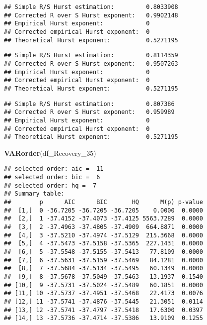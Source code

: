 \documentclass[
]{article}
\newenvironment{Shaded}{\begin{snugshade}}{\end{snugshade}}
\newcommand{\FunctionTok}[1]{\textcolor[rgb]{0.13,0.29,0.53}{\textbf{#1}}}
\newcommand{\NormalTok}[1]{#1}
\newcommand{\SpecialCharTok}[1]{\textcolor[rgb]{0.81,0.36,0.00}{\textbf{#1}}}
\begin{document}
\begin{verbatim}
## Simple R/S Hurst estimation:         0.8033908 
## Corrected R over S Hurst exponent:   0.9902148 
## Empirical Hurst exponent:            0 
## Corrected empirical Hurst exponent:  0 
## Theoretical Hurst exponent:          0.5271195
\end{verbatim}

\begin{Shaded}
\end{Shaded}

\begin{verbatim}
## Simple R/S Hurst estimation:         0.8114359 
## Corrected R over S Hurst exponent:   0.9507263 
## Empirical Hurst exponent:            0 
## Corrected empirical Hurst exponent:  0 
## Theoretical Hurst exponent:          0.5271195
\end{verbatim}

\begin{Shaded}
\end{Shaded}

\begin{verbatim}
## Simple R/S Hurst estimation:         0.807386 
## Corrected R over S Hurst exponent:   0.959989 
## Empirical Hurst exponent:            0 
## Corrected empirical Hurst exponent:  0 
## Theoretical Hurst exponent:          0.5271195
\end{verbatim}

\begin{Shaded}
\begin{Highlighting}[]
\FunctionTok{VARorder}\NormalTok{(df\_Recovery\_35)}
\end{Highlighting}
\end{Shaded}

\begin{verbatim}
## selected order: aic =  11 
## selected order: bic =  6 
## selected order: hq =  7 
## Summary table:  
##        p      AIC      BIC       HQ      M(p) p-value
##  [1,]  0 -36.7205 -36.7205 -36.7205    0.0000  0.0000
##  [2,]  1 -37.4152 -37.4073 -37.4125 5563.7289  0.0000
##  [3,]  2 -37.4963 -37.4805 -37.4909  664.8871  0.0000
##  [4,]  3 -37.5210 -37.4974 -37.5129  215.3668  0.0000
##  [5,]  4 -37.5473 -37.5158 -37.5365  227.1431  0.0000
##  [6,]  5 -37.5548 -37.5155 -37.5413   77.8109  0.0000
##  [7,]  6 -37.5631 -37.5159 -37.5469   84.1281  0.0000
##  [8,]  7 -37.5684 -37.5134 -37.5495   60.1349  0.0000
##  [9,]  8 -37.5678 -37.5049 -37.5463   13.1937  0.1540
## [10,]  9 -37.5731 -37.5024 -37.5489   60.1851  0.0000
## [11,] 10 -37.5737 -37.4951 -37.5468   22.4173  0.0076
## [12,] 11 -37.5741 -37.4876 -37.5445   21.3051  0.0114
## [13,] 12 -37.5741 -37.4797 -37.5418   17.6300  0.0397
## [14,] 13 -37.5736 -37.4714 -37.5386   13.9109  0.1255
\end{verbatim}
\end{document}
